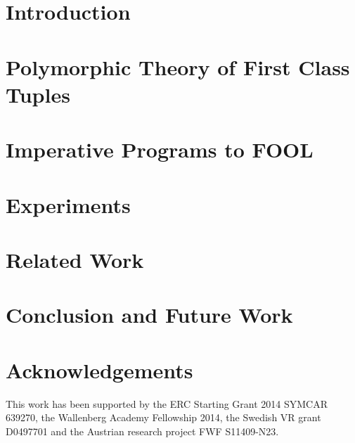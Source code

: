 



\section{Introduction}
\label{sec:boogie/introduction}


\section{Polymorphic Theory of First Class Tuples}
\label{sec:boogie/tuples}


\section{Imperative Programs to FOOL}
\label{sec:boogie/technique}


\section{Experiments}
\label{sec:boogie/experiments}


\section{Related Work}
\label{sec:boogie/related}


\section{Conclusion and Future Work}
\label{sec:boogie/conclusions}


\section*{Acknowledgements}
This work has been supported by the ERC Starting Grant 2014 SYMCAR 639270, the Wallenberg Academy Fellowship 2014, the Swedish VR grant D0497701 and the Austrian research project FWF S11409-N23.